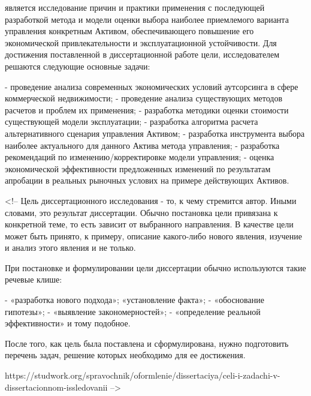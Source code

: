 является исследование причин и практики применения с последующей разработкой метода и модели оценки выбора наиболее приемлемого варианта управления конкретным Активом, обеспечивающего повышение его экономической привлекательности и эксплуатационной устойчивости.
Для достижения поставленной в диссертационной работе цели, исследователем решаются следующие основные задачи:

- проведение анализа современных экономических условий аутсорсинга в сфере коммерческой недвижимости;
- проведение анализа существующих методов расчетов и проблем их применения;
- разработка методики оценки стоимости существующей модели эксплуатации;
- разработка алгоритма расчета альтернативного сценария управления Активом;
- разработка инструмента выбора наиболее актуального для данного Актива метода управления;
- разработка рекомендаций по изменению/корректировке модели управления;
- оценка экономической эффективности предложенных изменений по результатам апробации в реальных рыночных услових на примере действующих Активов.

<!-- 
Цель диссертационного исследования - то, к чему стремится автор. Иными словами, это результат диссертации. Обычно постановка цели привязана к конкретной теме, то есть зависит от выбранного направления. В качестве цели может быть принято, к примеру, описание какого-либо нового явления, изучение и анализ этого явления и не только.

При постановке и формулировании цели диссертации обычно используются такие речевые клише: 

- «разработка нового подхода»; «установление факта»;
- «обоснование гипотезы»;
- «выявление закономерностей»;
- «определение реальной эффективности» и тому подобное.

После того, как цель была поставлена и сформулирована, нужно подготовить перечень задач, решение которых необходимо для ее достижения.

https://studwork.org/spravochnik/oformlenie/dissertaciya/celi-i-zadachi-v-dissertacionnom-issledovanii -->